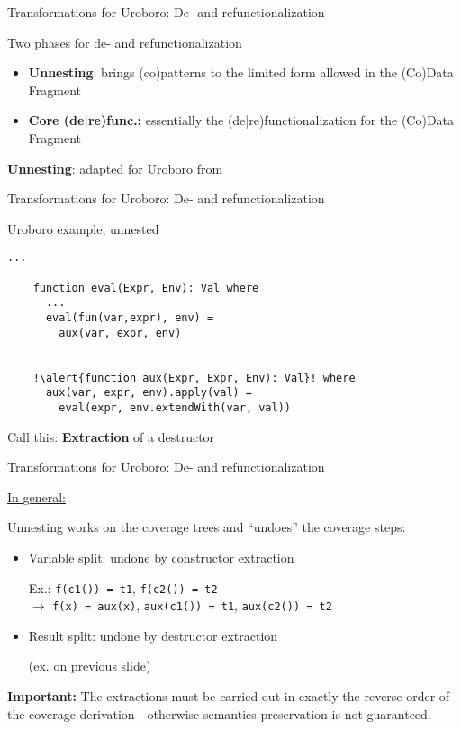 \documentclass[xcolor=svgnames]{beamer}
\begin{document}
\begin{frame}[fragile]
  {Transformations for Uroboro: De- and refunctionalization}

  \begin{block}{Two phases for de- and refunctionalization}
    \begin{itemize}
      \item \textbf{Unnesting}: brings (co)patterns to the limited form allowed in the (Co)Data Fragment
      \item \textbf{Core (de|re)func.:} essentially the (de|re)functionalization for the (Co)Data Fragment
    \end{itemize}
  \end{block}

  \textbf{Unnesting}: adapted for Uroboro from \citet{setzer14unnesting}
\end{frame}

\begin{frame}[fragile]
  {Transformations for Uroboro: De- and refunctionalization}

  \begin{block}{Uroboro example, unnested}
    \begin{lstlisting}[escapechar=!]
    ...

    function eval(Expr, Env): Val where
      ...
      eval(fun(var,expr), env) =
        aux(var, expr, env)
        

    !\alert{function aux(Expr, Expr, Env): Val}! where
      aux(var, expr, env).apply(val) =
        eval(expr, env.extendWith(var, val))
    \end{lstlisting}
  \end{block}

  Call this: \textbf{Extraction} of a destructor
\end{frame}

\begin{frame}
  {Transformations for Uroboro: De- and refunctionalization}

\underline{In general:}

Unnesting works on the coverage trees and ``undoes'' the coverage steps:
\begin{itemize}
\item Variable split: undone by constructor extraction

Ex.: \texttt{f(c1()) = t1}, \texttt{f(c2()) = t2} \\
\qquad $\to$ \texttt{f(x) = aux(x)}, \texttt{aux(c1()) = t1}, \texttt{aux(c2()) = t2}

\item Result split: undone by destructor extraction

(ex. on previous slide)
\end{itemize}

\textbf{Important:} The extractions must be carried out in exactly the reverse order of the coverage derivation---otherwise semantics preservation is not guaranteed.
\end{frame}
\end{document}
